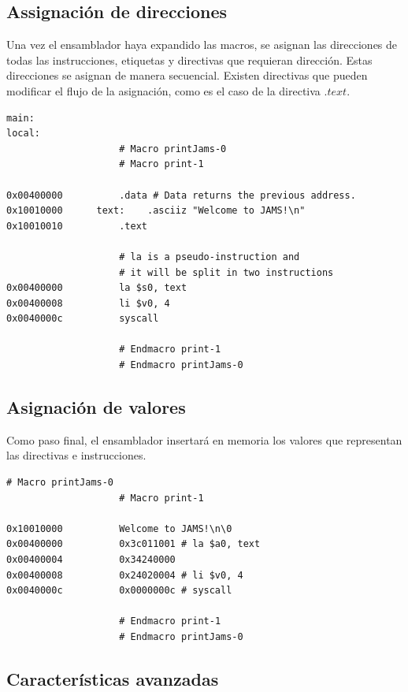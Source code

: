 \subsection{Assignación de direcciones}\label{subsec:assignacion-de-direcciones}

Una vez el ensamblador haya expandido las macros,
se asignan las direcciones de todas las instrucciones,
etiquetas y directivas que requieran dirección.
Estas direcciones se asignan de manera secuencial.
Existen directivas que pueden modificar el flujo de la asignación,
como es el caso de la directiva $.text$.

\begin{lstlisting}[frame=single,label={lst:address-assignation}]
main:
local:
                    # Macro printJams-0
                    # Macro print-1

0x00400000          .data # Data returns the previous address.
0x10010000      text:    .asciiz "Welcome to JAMS!\n"
0x10010010          .text

                    # la is a pseudo-instruction and
                    # it will be split in two instructions
0x00400000          la $s0, text
0x00400008          li $v0, 4
0x0040000c          syscall

                    # Endmacro print-1
                    # Endmacro printJams-0
\end{lstlisting}

\subsection{Asignación de valores}\label{subsec:asignacion-de-valores}

Como paso final, el ensamblador insertará en memoria los valores
que representan las directivas e instrucciones.

\begin{lstlisting}[frame=single,label={lst:value-assignation}]
                    # Macro printJams-0
                    # Macro print-1

0x10010000          Welcome to JAMS!\n\0
0x00400000          0x3c011001 # la $a0, text
0x00400004          0x34240000
0x00400008          0x24020004 # li $v0, 4
0x0040000c          0x0000000c # syscall

                    # Endmacro print-1
                    # Endmacro printJams-0
\end{lstlisting}

\subsection{Características avanzadas}\label{subsec:características-avanzadas}

